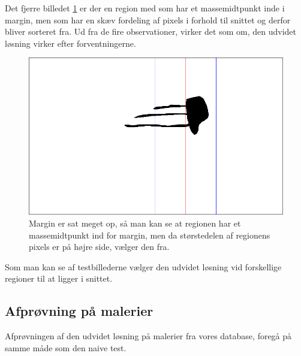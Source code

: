 Det fjerre billedet \ref{bleksprutte_test} er der en region med som har
et massemidtpunkt inde i margin, men som har en skæv fordeling af pixels
i forhold til snittet og derfor bliver sorteret fra. Ud fra de fire
observationer, virker det som om, den udvidet løsning virker efter
forventningerne.

\begin{figure}[h!!]
	\begin{center}
		\includegraphics[scale=0.3,angle=0]{afsnit/afprovning/billeder/udvidet_losning/udvidet_bleksprutte_test.png}
	\end{center}
	\caption[]{Margin er sat meget op, så man kan se at regionen har et massemidtpunkt ind for margin, men da størstedelen af regionens pixels er på højre side, vælger den fra.}
	\label{bleksprutte_test}
\end{figure}

Som man kan se af testbillederne vælger den udvidet løsning vid
forskellige regioner til at ligger i snittet. 
\clearpage


\subsection{Afprøvning på malerier}
Afprøvningen af den udvidet løsning på malerier fra vores database,
foregå på samme måde som den naive test.


